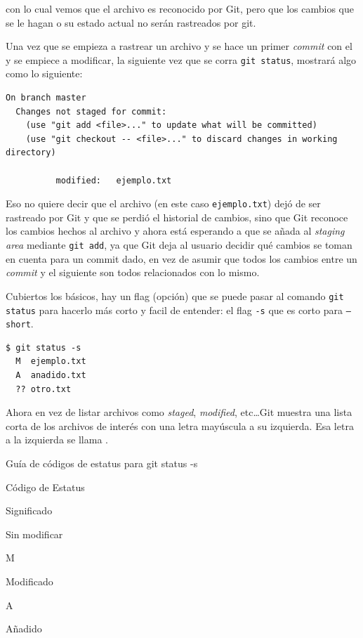 \documentclass[spanish, 12pt, a4paper]{article}
\begin{document}
con lo cual vemos que el archivo es reconocido por Git, pero que los
cambios que se le hagan o su estado actual no serán rastreados por git.

Una vez que se empieza a rastrear un archivo y se hace un primer
\emph{commit} con el y se empiece a modificar, la siguiente vez que se
corra \passthrough{\lstinline!git status!}, mostrará algo como lo
siguiente:

\begin{lstlisting}
On branch master
  Changes not staged for commit:
    (use "git add <file>..." to update what will be committed)
    (use "git checkout -- <file>..." to discard changes in working directory)

          modified:   ejemplo.txt
\end{lstlisting}

Eso no quiere decir que el archivo (en este caso
\passthrough{\lstinline!ejemplo.txt!}) dejó de ser rastreado por Git y
que se perdió el historial de cambios, sino que Git reconoce los cambios
hechos al archivo y ahora está esperando a que se añada al \emph{staging
area} mediante \passthrough{\lstinline!git add!}, ya que Git deja al
usuario decidir qué cambios se toman en cuenta para un commit dado, en
vez de asumir que todos los cambios entre un \emph{commit} y el
siguiente son todos relacionados con lo mismo.

Cubiertos los básicos, hay un flag (opción) que se puede pasar al
comando \passthrough{\lstinline!git status!} para hacerlo más corto y
facil de entender: el flag \passthrough{\lstinline!-s!} que es corto
para \passthrough{\lstinline!–short!}.

\begin{lstlisting}
$ git status -s
  M  ejemplo.txt
  A  anadido.txt
  ?? otro.txt
\end{lstlisting}

Ahora en vez de listar archivos como \emph{staged}, \emph{modified},
etc\ldots Git muestra una lista corta de los archivos de interés con una
letra mayúscula a su izquierda. Esa letra a la izquierda se llama .

Guía de códigos de estatus para git status -s

Código de Estatus

Significado

Sin modificar

M

Modificado

A

Añadido
\end{document}
